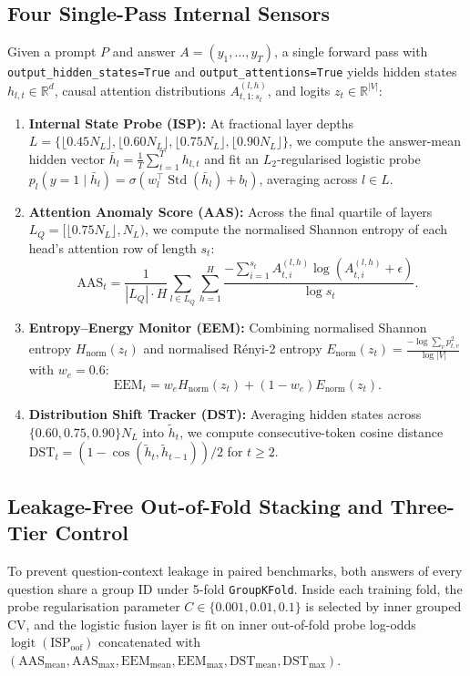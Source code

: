 \documentclass[journal]{IEEEtran}
\begin{document}
\subsection{Four Single-Pass Internal Sensors}
Given a prompt $P$ and answer $A = (y_1,\dots,y_T)$, a single forward pass with \texttt{output\_hidden\_states=True} and \texttt{output\_attentions=True} yields hidden states $h_{l,t} \in \mathbb{R}^d$, causal attention distributions $A^{(l,h)}_{t,1:s_t}$, and logits $z_t \in \mathbb{R}^{|V|}$:
\begin{enumerate}
    \item \textbf{Internal State Probe (ISP):} At fractional layer depths $L = \{\lfloor 0.45N_L\rfloor, \lfloor 0.60N_L\rfloor, \lfloor 0.75N_L\rfloor, \lfloor 0.90N_L\rfloor\}$, we compute the answer-mean hidden vector $\bar{h}_l = \frac{1}{T}\sum_{t=1}^T h_{l,t}$ and fit an $L_2$-regularised logistic probe $p_l(y=1\mid\bar{h}_l) = \sigma(w_l^\top \operatorname{Std}(\bar{h}_l)+b_l)$, averaging across $l \in L$.
    \item \textbf{Attention Anomaly Score (AAS):} Across the final quartile of layers $L_Q = [\lfloor 0.75N_L\rfloor, N_L)$, we compute the normalised Shannon entropy of each head's attention row of length $s_t$:
    \begin{equation}
        \text{AAS}_t = \frac{1}{|L_Q|\cdot H}\sum_{l \in L_Q}\sum_{h=1}^H \frac{-\sum_{i=1}^{s_t} A^{(l,h)}_{t,i}\log(A^{(l,h)}_{t,i}+\epsilon)}{\log s_t}.
    \end{equation}
    \item \textbf{Entropy--Energy Monitor (EEM):} Combining normalised Shannon entropy $H_{\text{norm}}(z_t)$ and normalised R\'enyi-2 entropy $E_{\text{norm}}(z_t) = \frac{-\log\sum_v p_{t,v}^2}{\log|V|}$ with $w_e = 0.6$:
    \begin{equation}
        \text{EEM}_t = w_e H_{\text{norm}}(z_t) + (1-w_e)E_{\text{norm}}(z_t).
    \end{equation}
    \item \textbf{Distribution Shift Tracker (DST):} Averaging hidden states across $\{0.60, 0.75, 0.90\}N_L$ into $\tilde{h}_t$, we compute consecutive-token cosine distance $\text{DST}_t = (1-\cos(\tilde{h}_t,\tilde{h}_{t-1}))/2$ for $t \ge 2$.
\end{enumerate}

\subsection{Leakage-Free Out-of-Fold Stacking and Three-Tier Control}
To prevent question-context leakage in paired benchmarks, both answers of every question share a group ID under 5-fold \texttt{GroupKFold}. Inside each training fold, the probe regularisation parameter $C \in \{0.001, 0.01, 0.1\}$ is selected by inner grouped CV, and the logistic fusion layer is fit on inner out-of-fold probe log-odds $\operatorname{logit}(\text{ISP}_{\text{oof}})$ concatenated with $(\text{AAS}_{\text{mean}}, \text{AAS}_{\text{max}}, \text{EEM}_{\text{mean}}, \text{EEM}_{\text{max}}, \text{DST}_{\text{mean}}, \text{DST}_{\text{max}})$.
\end{document}
